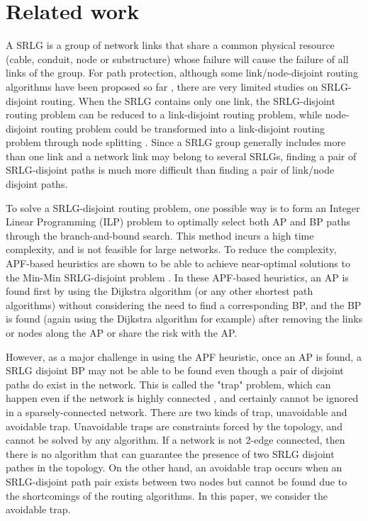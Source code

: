 \section{Related work}
\label{sec:Related}
 A SRLG is a group of network links that share a common physical resource (cable, conduit, node or substructure) whose failure will cause the failure of all links of the group. For path protection, although some link/node-disjoint routing algorithms have been proposed so far \cite{suurballe1984quick,bhandari1997optimal,li1990complexity,guo2003link,xu2004finding,beshir2011variants,guo2013finding,hu2003diverse}, there are very limited studies on SRLG-disjoint routing. When the SRLG contains only one link, the SRLG-disjoint routing problem can be reduced to a link-disjoint routing problem, while node-disjoint routing problem could be transformed into a link-disjoint routing problem through node splitting \cite{ford2015flows}.
Since a SRLG group generally includes more than one link and a network link may belong to several SRLGs, finding a pair of SRLG-disjoint paths is much more difficult than finding a pair of link/node disjoint paths.


To solve a SRLG-disjoint routing problem, one possible way is to form an Integer Linear Programming (ILP)\cite{hu2003diverse} problem to optimally select both AP and BP paths through the branch-and-bound search. This method incurs a high time complexity, and is not feasible for large networks. To reduce the complexity, APF-based heuristics are shown to be able to achieve near-optimal solutions to the Min-Min SRLG-disjoint problem \cite{oki2002disjoint,li2002fiber,eppstein1998finding}. In these APF-based heuristics, an AP is found first by using the Dijkstra algorithm (or any other shortest path algorithms) without considering the need to find a corresponding BP, and the BP is found (again using the Dijkstra algorithm for example) after removing the links or nodes along the AP or share the risk with the AP.

However, as a major challenge in using the APF heuristic, once an AP is found, a SRLG disjoint BP  may not be able to be found even though a pair of disjoint paths do exist in the network. This is called the "trap" problem, which can happen even if the network is highly connected \cite{laborczi2001solving}, and certainly cannot be ignored in a sparsely-connected network. There are two kinds of trap, unavoidable and avoidable trap. Unavoidable traps are constraints forced by the topology, and cannot be solved by any algorithm. If a network is not 2-edge connected, then there is no algorithm that can guarantee the presence of two SRLG disjoint pathes in the topology. On the other hand, an avoidable trap occurs when an SRLG-disjoint path pair exists between two nodes but  cannot be found due to the shortcomings of the routing algorithms. In this paper, we consider the avoidable trap.

